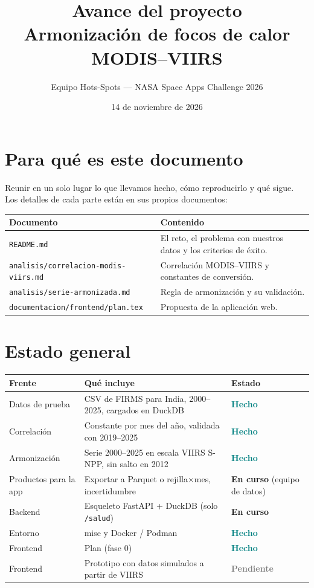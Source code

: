 \documentclass[11pt,a4paper]{article}
\title{Avance del proyecto\\[0.3em]
  \large Armonización de focos de calor MODIS--VIIRS}
\author{Equipo Hots-Spots --- NASA Space Apps Challenge 2026}
\date{14 de noviembre de 2026}
\newcommand{\hecho}{\textcolor{teal}{\textbf{Hecho}}}
\newcommand{\encurso}{\textcolor{orange!80!black}{\textbf{En curso}}}
\newcommand{\pendiente}{\textcolor{gray}{\textbf{Pendiente}}}
\begin{document}
\maketitle

\section{Para qué es este documento}

Reunir en un solo lugar lo que llevamos hecho, cómo reproducirlo y qué sigue. Los
detalles de cada parte están en sus propios documentos:

\begin{tabularx}{\linewidth}{@{}lX@{}}
\toprule
Documento & Contenido \\
\midrule
\texttt{README.md} & El reto, el problema con nuestros datos y los criterios de éxito. \\
\texttt{analisis/correlacion-modis-viirs.md} & Correlación MODIS--VIIRS y constantes de conversión. \\
\texttt{analisis/serie-armonizada.md} & Regla de armonización y su validación. \\
\texttt{documentacion/frontend/plan.tex} & Propuesta de la aplicación web. \\
\bottomrule
\end{tabularx}

\section{Estado general}

\begin{tabularx}{\linewidth}{@{}lXl@{}}
\toprule
Frente & Qué incluye & Estado \\
\midrule
Datos de prueba & CSV de FIRMS para India, 2000--2025, cargados en DuckDB & \hecho \\
Correlación & Constante por mes del año, validada con 2019--2025 & \hecho \\
Armonización & Serie 2000--2025 en escala VIIRS S-NPP, sin salto en 2012 & \hecho \\
Productos para la app & Exportar a Parquet o rejilla$\times$mes, incertidumbre & \encurso{} (equipo de datos) \\
Backend & Esqueleto FastAPI + DuckDB (solo \texttt{/salud}) & \encurso \\
Entorno & mise y Docker / Podman & \hecho \\
Frontend & Plan (fase 0) & \hecho \\
Frontend & Prototipo con datos simulados a partir de VIIRS & \pendiente \\
\bottomrule
\end{tabularx}
\end{document}

